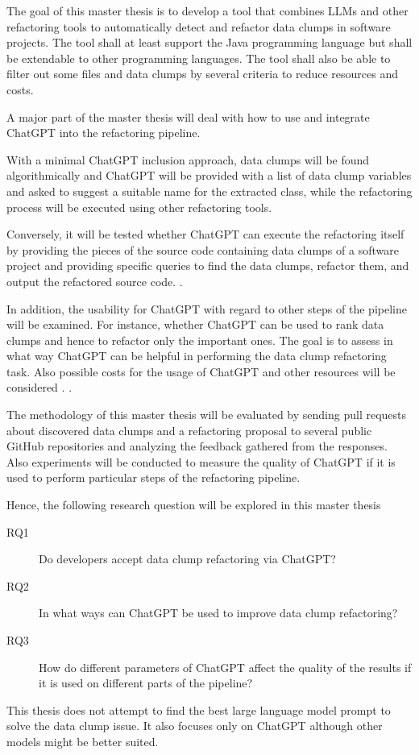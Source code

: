 The goal of this master thesis is to develop a tool that combines \acp{LLM} and other refactoring tools to automatically detect and refactor data clumps in software projects. The tool  shall at least support the Java programming language but shall be extendable to  other programming languages. The tool shall also  be able to filter out some files and data clumps by several criteria to reduce resources and costs. 


A major part of the master thesis will deal with how to use and integrate ChatGPT into the refactoring pipeline. 

With a minimal ChatGPT inclusion approach,  data clumps will be found algorithmically  and ChatGPT will be provided with a list of data clump variables and asked to suggest a suitable name for the extracted class, while the refactoring process will be executed using other refactoring tools.


Conversely, it will be tested whether ChatGPT can execute the refactoring itself by providing the pieces of the source code containing data clumps of a software project and providing specific queries to find the data clumps, refactor them, and output the refactored source code. \cite{White2023ChatGPTPP}.

In addition, the usability for ChatGPT with regard to other steps of the pipeline will be examined. For instance, whether ChatGPT can be used to rank data clumps and hence to refactor only the important ones. The goal is to assess in what way ChatGPT can be helpful in performing the data clump refactoring task. Also possible costs for the usage of ChatGPT and other resources will be considered \cite{xia2023conversation}. \cite{4ef0b456377aafb68884e643779dffb36b8e7cc1}.


The methodology of this master thesis will be evaluated by sending  pull requests about discovered data clumps and a refactoring proposal to several public GitHub repositories and analyzing the feedback gathered from the responses. Also experiments will be conducted to measure the quality of ChatGPT if it is used to perform particular steps of the refactoring pipeline.  

Hence, the following research question will be explored in this master thesis

\begin{description}
    \item [RQ1] Do developers accept data clump refactoring via ChatGPT?
    \item [RQ2] In what ways can ChatGPT be used to improve data clump refactoring?
    \item [RQ3] How do different parameters of ChatGPT affect the quality of the results if it is used on different parts of the pipeline?
\end{description}
This thesis does not attempt to find the best large language model prompt to solve the data clump issue. It also focuses only on ChatGPT although other models might be better suited. 
